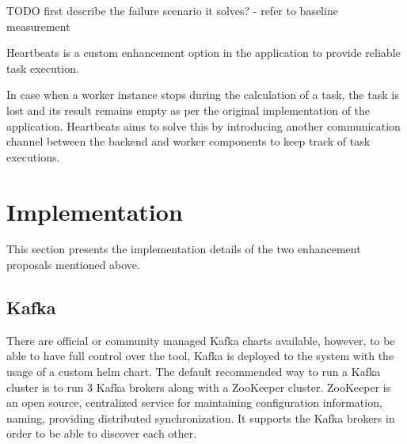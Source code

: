 TODO first describe the failure scenario it solves? -  refer to baseline measurement

Heartbeats is a custom enhancement option in the application to provide reliable task execution.

In case when a worker instance stops during the calculation of a task, the task is lost and its result remains empty as per the original implementation of the application. Heartbeats aims to solve this by introducing another communication channel between the backend and worker components to keep track of task executions.

\section{Implementation}

This section presents the implementation details of the two enhancement proposals mentioned above.

\subsection{Kafka}


There are official or community managed Kafka charts available, however, to be able to have full control over the tool, Kafka is deployed to the system with the usage of a custom helm chart. The default recommended way to run a Kafka cluster is to run 3 Kafka brokers along with a ZooKeeper cluster. ZooKeeper \cite{ZooKeeper} is an open source, centralized service for maintaining configuration information, naming, providing distributed synchronization. It supports the Kafka brokers in order to be able to discover each other.

